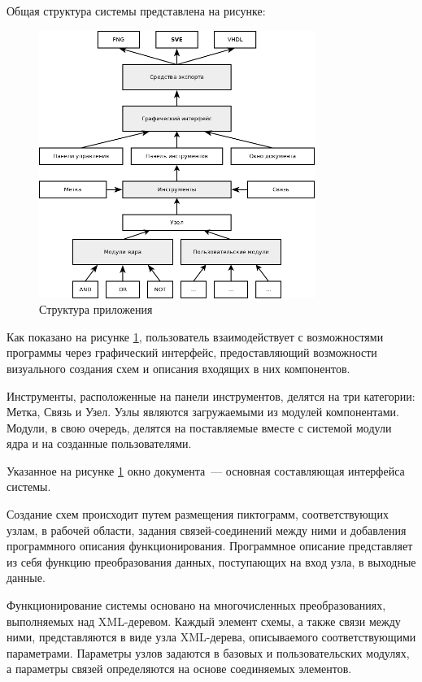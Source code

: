 Общая структура системы представлена на рисунке:
\begin{figure}[H]
  \centering
  \includegraphics[width=0.8\textwidth]{diagrams/structure.png}
  \caption{Структура приложения}
  \label{fig:structure}
\end{figure}

Как показано на рисунке \ref{fig:structure}, пользователь взаимодействует с возможностями программы через графический интерфейс, предоставляющий возможности визуального создания схем и описания входящих в них компонентов.

Инструменты, расположенные на панели инструментов, делятся на три категории: Метка, Связь и Узел.
Узлы являются загружаемыми из модулей компонентами.
Модули, в свою очередь, делятся на поставляемые вместе с системой модули ядра и на созданные пользователями.

Указанное на рисунке \ref{fig:structure} окно документа~--- основная составляющая интерфейса системы.

Создание схем происходит путем размещения пиктограмм, соответствующих узлам, в рабочей области, задания связей-соединений между ними и добавления программного описания функционирования.
Программное описание представляет из себя функцию преобразования данных, поступающих на вход узла, в выходные данные.

Функционирование системы основано на многочисленных преобразованиях, выполняемых над XML-деревом.
Каждый элемент схемы, а также связи между ними, представляются в виде узла XML-дерева, описываемого соответствующими параметрами.
Параметры узлов задаются в базовых и пользовательских модулях, а параметры связей определяются на основе соединяемых элементов.

